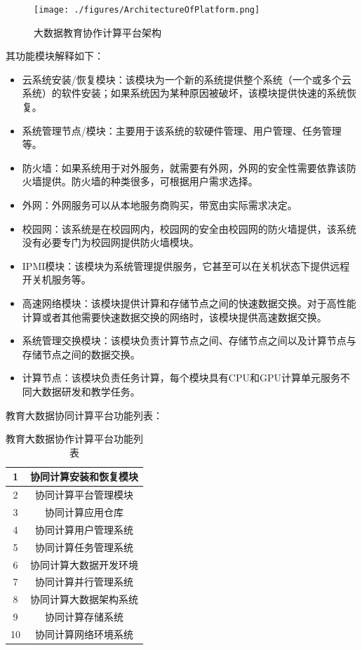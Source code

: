 \documentclass[12pt]{ctexart}%
\begin{document}
\begin{figure}[!htb]
\centering
\texttt{[image: ./figures/ArchitectureOfPlatform.png]}
\caption{大数据教育协作计算平台架构}
\label{fig:architecture}
\end{figure}
其功能模块解释如下：
\begin{itemize}
\item 云系统安装/恢复模块：该模块为一个新的系统提供整个系统（一个或多个云系统）的软件安装；如果系统因为某种原因被破坏，该模块提供快速的系统恢复。
\item 系统管理节点/模块：主要用于该系统的软硬件管理、用户管理、任务管理等。
\item 防火墙：如果系统用于对外服务，就需要有外网，外网的安全性需要依靠该防火墙提供。防火墙的种类很多，可根据用户需求选择。
\item 外网：外网服务可以从本地服务商购买，带宽由实际需求决定。
\item 校园网：该系统是在校园网内，校园网的安全由校园网的防火墙提供，该系统没有必要专门为校园网提供防火墙模块。
\item IPMI模块：该模块为系统管理提供服务，它甚至可以在关机状态下提供远程开关机服务等。
\item 高速网络模块：该模块提供计算和存储节点之间的快速数据交换。对于高性能计算或者其他需要快速数据交换的网络时，该模块提供高速数据交换。
\item 系统管理交换模块：该模块负责计算节点之间、存储节点之间以及计算节点与存储节点之间的数据交换。
\item 计算节点：该模块负责任务计算，每个模块具有CPU和GPU计算单元服务不同大数据研发和教学任务。
\end{itemize}
教育大数据协同计算平台功能列表：

\begin{table}[!htb]
\centering
\caption{教育大数据协作计算平台功能列表}  \label{table1}
\begin{tabular}{|c|c|} \hline
1 & 协同计算安装和恢复模块 \\ \hline
2 & 协同计算平台管理模块   \\ \hline
3 & 协同计算应用仓库     \\ \hline
4 & 协同计算用户管理系统  \\ \hline
5 & 协同计算任务管理系统  \\ \hline
6 & 协同计算大数据开发环境 \\ \hline
7 & 协同计算并行管理系统   \\ \hline
8 & 协同计算大数据架构系统  \\ \hline
9 & 协同计算存储系统 \\ \hline
10 & 协同计算网络环境系统  \\ \hline
\end{tabular}
\end{table}
\end{document}
